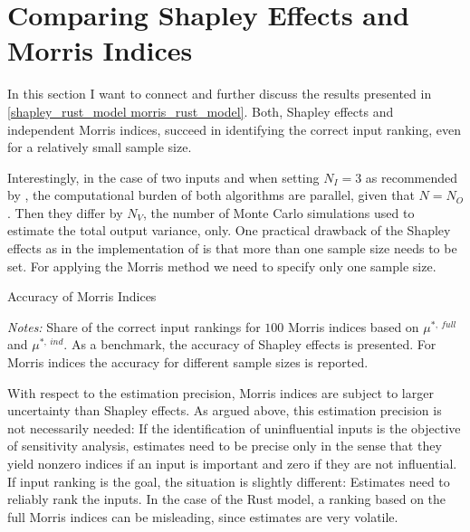 \section{Comparing Shapley Effects and Morris Indices} \label{comparison}

In this section I want to connect and further discuss the results presented in \cref{shapley_rust_model morris_rust_model}. Both, Shapley effects and independent Morris indices, succeed in identifying the correct input ranking, even for a relatively small sample size.

Interestingly, in the case of two inputs and when setting $N_I = 3$ as recommended
by \citet{SNS16}, the computational burden of both algorithms are parallel, given that $N = N_O$. Then they differ by $N_V$, the number of Monte Carlo simulations used to estimate the total output variance, only. One practical drawback
of the Shapley effects as in the implementation of \citet{SNS16} is that more than one sample size needs to be set. For applying the Morris method we need to specify only one sample size.

\begin{table}
	\centering
	\caption{Accuracy of Morris Indices}
	\label{accuracy}
	\begin{threeparttable}
	\centering
	
	\begin{tablenotes}
	\small
	\item \textit{Notes:} Share of the correct input rankings for $100$ Morris indices based on $\mu^{\ast,\ full}$ and $\mu^{\ast,\ ind}$. As a benchmark, the accuracy of Shapley effects is presented. For Morris indices the accuracy for different sample sizes is reported.
	\end{tablenotes}
	\end{threeparttable}
\end{table}

With respect to the estimation precision, Morris indices are subject to larger uncertainty
than Shapley effects. As argued above, this estimation precision is not necessarily needed: If
the identification of uninfluential inputs is the objective of sensitivity analysis, estimates need to be precise
only in the sense that they yield nonzero indices if an input is important and zero if they
are not influential. If input ranking is the goal, the situation is slightly different: Estimates need to reliably rank the inputs.
In the case of the Rust model, a ranking based on the full Morris indices can be misleading, since estimates are very volatile.

